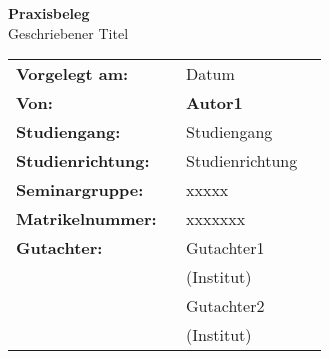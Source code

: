
\begin{titlepage}
\begin{center}

\textbf{\Huge Praxisbeleg}\\
\vspace{1.5cm}
\LARGE{Geschriebener Titel \\}
\vspace{1.5cm}
\end{center}
\begin{flushleft}
\large{
\begin{tabular}{l l r}
\vspace{1.0cm}
\textbf{Vorgelegt am:}\quad\quad\quad & Datum\\

\textbf{Von:}           ~ & \textbf{Autor1}\\

\textbf{Studiengang:}   ~ & Studiengang \\
\vspace{1.0cm}
\textbf{Studienrichtung:} ~ & Studienrichtung \\
\vspace{1.0cm}
\textbf{Seminargruppe:} ~ & xxxxx \\

\textbf{Matrikelnummer:} ~ & xxxxxxx \\

\textbf{Gutachter:}     ~ & Gutachter1 \\ ~ & (Institut)\\
                        ~ & Gutachter2 \\ ~ & (Institut)\\
                        
\end{tabular}}
\end{flushleft}
\end{titlepage}
\newpage